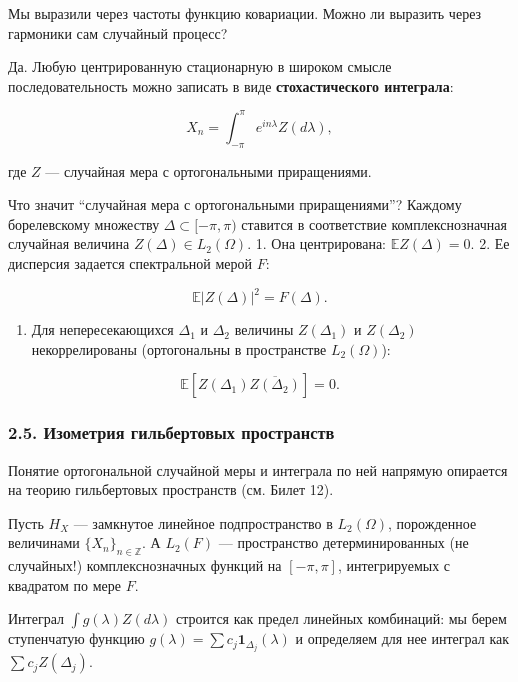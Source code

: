 \documentclass[
  11pt,
  a4paper,
]{article}
\providecommand{\tightlist}{%
  \setlength{\itemsep}{0pt}\setlength{\parskip}{0pt}}
\begin{document}
Мы выразили через частоты функцию ковариации. Можно ли выразить через
гармоники сам случайный процесс?

Да. Любую центрированную стационарную в широком смысле
последовательность можно записать в виде \textbf{стохастического
интеграла}:

\[
X_n = \int_{-\pi}^{\pi} e^{i n \lambda} Z(d\lambda),
\]

где \(Z\) --- случайная мера с ортогональными приращениями.

Что значит ``случайная мера с ортогональными приращениями''? Каждому
борелевскому множеству \(\Delta \subset [-\pi, \pi)\) ставится в
соответствие комплекснозначная случайная величина
\(Z(\Delta) \in L_2(\Omega)\). 1. Она центрирована:
\(\mathbb E Z(\Delta) = 0\). 2. Ее дисперсия задается спектральной мерой
\(F\):

\[
\mathbb E|Z(\Delta)|^2 = F(\Delta).
\]

\begin{enumerate}
\def\labelenumi{\arabic{enumi}.}
\setcounter{enumi}{2}
\tightlist
\item
  Для непересекающихся \(\Delta_1\) и \(\Delta_2\) величины
  \(Z(\Delta_1)\) и \(Z(\Delta_2)\) некоррелированы (ортогональны в
  пространстве \(L_2(\Omega)\)):
\end{enumerate}

\[
\mathbb E[Z(\Delta_1) \overline{Z(\Delta_2)}] = 0.
\]

\subsubsection{2.5. Изометрия гильбертовых
пространств}\label{ux438ux437ux43eux43cux435ux442ux440ux438ux44f-ux433ux438ux43bux44cux431ux435ux440ux442ux43eux432ux44bux445-ux43fux440ux43eux441ux442ux440ux430ux43dux441ux442ux432}

Понятие ортогональной случайной меры и интеграла по ней напрямую
опирается на теорию гильбертовых пространств (см. Билет 12).

Пусть \(H_X\) --- замкнутое линейное подпространство в \(L_2(\Omega)\),
порожденное величинами \(\{X_n\}_{n \in \mathbb{Z}}\). А \(L_2(F)\) ---
пространство детерминированных (не случайных!) комплекснозначных функций
на \([-\pi, \pi]\), интегрируемых с квадратом по мере \(F\).

Интеграл \(\int g(\lambda) Z(d\lambda)\) строится как предел линейных
комбинаций: мы берем ступенчатую функцию
\(g(\lambda) = \sum c_j \mathbf{1}_{\Delta_j}(\lambda)\) и определяем
для нее интеграл как \(\sum c_j Z(\Delta_j)\).
\end{document}
